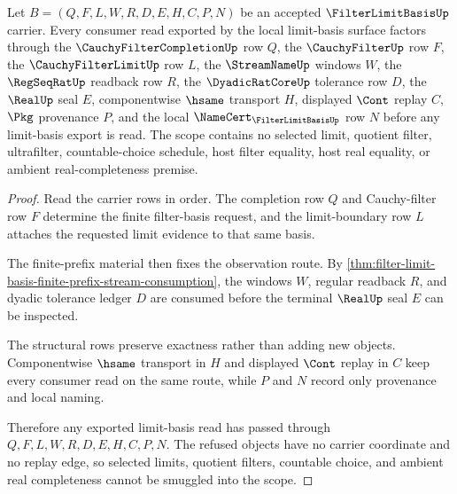 \begin{theorem}
\label{thm:filter-limit-basis-scope-exactness}
Let $B=(Q,F,L,W,R,D,E,H,C,P,N)$ be an accepted $\FilterLimitBasisUp$ carrier. Every consumer read exported by the local limit-basis surface factors through the $\CauchyFilterCompletionUp$ row $Q$, the $\CauchyFilterUp$ row $F$, the $\CauchyFilterLimitUp$ row $L$, the $\StreamNameUp$ windows $W$, the $\RegSeqRatUp$ readback row $R$, the $\DyadicRatCoreUp$ tolerance row $D$, the $\RealUp$ seal $E$, componentwise $\hsame$ transport $H$, displayed $\Cont$ replay $C$, $\Pkg$ provenance $P$, and the local $\NameCert_{\FilterLimitBasisUp}$ row $N$ before any limit-basis export is read. The scope contains no selected limit, quotient filter, ultrafilter, countable-choice schedule, host filter equality, host real equality, or ambient real-completeness premise.
\end{theorem}
\begin{proof}
Read the carrier rows in order. The completion row $Q$ and Cauchy-filter row $F$ determine the finite filter-basis request, and the limit-boundary row $L$ attaches the requested limit evidence to that same basis.

The finite-prefix material then fixes the observation route. By \autoref{thm:filter-limit-basis-finite-prefix-stream-consumption}, the windows $W$, regular readback $R$, and dyadic tolerance ledger $D$ are consumed before the terminal $\RealUp$ seal $E$ can be inspected.

The structural rows preserve exactness rather than adding new objects. Componentwise $\hsame$ transport in $H$ and displayed $\Cont$ replay in $C$ keep every consumer read on the same route, while $P$ and $N$ record only provenance and local naming.

Therefore any exported limit-basis read has passed through $Q,F,L,W,R,D,E,H,C,P,N$. The refused objects have no carrier coordinate and no replay edge, so selected limits, quotient filters, countable choice, and ambient real completeness cannot be smuggled into the scope.
\end{proof}

